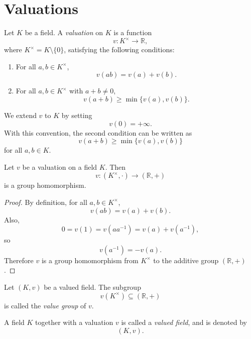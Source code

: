 \section{Valuations}

\begin{definition}[Valuation]
    Let \(K\) be a field. A \emph{valuation} on \(K\) is a function
    \[
        v:K^\times\longrightarrow \mathbb R,
    \]
    where \(K^\times=K\setminus\{0\}\), satisfying the following conditions:
    \begin{enumerate}
        \item For all \(a,b\in K^\times\),
              \[
                  v(ab)=v(a)+v(b).
              \]
        \item For all \(a,b\in K^\times\) with \(a+b\neq 0\),
              \[
                  v(a+b)\geq \min\{v(a),v(b)\}.
              \]
    \end{enumerate}
    We extend \(v\) to \(K\) by setting
    \[
        v(0)=+\infty.
    \]
    With this convention, the second condition can be written as
    \[
        v(a+b)\geq \min\{v(a),v(b)\}
    \]
    for all \(a,b\in K\).
\end{definition}

\begin{proposition}
    Let \(v\) be a valuation on a field \(K\). Then
    \[
        v:(K^\times,\cdot)\longrightarrow (\mathbb R,+)
    \]
    is a group homomorphism.
\end{proposition}

\begin{proof}
    By definition, for all \(a,b\in K^\times\),
    \[
        v(ab)=v(a)+v(b).
    \]
    Also,
    \[
        0=v(1)=v(aa^{-1})=v(a)+v(a^{-1}),
    \]
    so
    \[
        v(a^{-1})=-v(a).
    \]
    Therefore \(v\) is a group homomorphism from \(K^\times\) to the additive group
    \((\mathbb R,+)\).
\end{proof}

\begin{definition}
    Let \((K,v)\) be a valued field. The subgroup
    \[
        v(K^\times)\subseteq (\mathbb R,+)
    \]
    is called the \emph{value group} of \(v\).

    A field \(K\) together with a valuation \(v\) is called a \emph{valued field},
    and is denoted by
    \[
        (K,v).
    \]
\end{definition}

